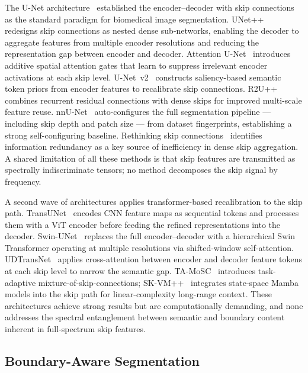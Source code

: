 \documentclass[journal]{IEEEtran}
\begin{document}
The U-Net architecture~\cite{ronneberger2015unet} established the
encoder--decoder with skip connections as the standard paradigm for biomedical
image segmentation.
UNet++~\cite{zhou2019unetpp} redesigns skip connections as nested dense
sub-networks, enabling the decoder to aggregate features from multiple encoder
resolutions and reducing the representation gap between encoder and decoder.
Attention U-Net~\cite{oktay2018attnunet} introduces additive spatial attention
gates that learn to suppress irrelevant encoder activations at each skip level.
U-Net~v2~\cite{peng2023unetv2} constructs saliency-based semantic token priors
from encoder features to recalibrate skip connections.
R2U++~\cite{alom2022r2upp} combines recurrent residual connections with dense
skips for improved multi-scale feature reuse.
nnU-Net~\cite{isensee2021nnu} auto-configures the full segmentation pipeline ---
including skip depth and patch size --- from dataset fingerprints, establishing
a strong self-configuring baseline.
Rethinking skip connections~\cite{rethinkskips2024} identifies information
redundancy as a key source of inefficiency in dense skip aggregation.
A shared limitation of all these methods is that skip features are transmitted
as spectrally indiscriminate tensors; no method decomposes the skip signal by
frequency.

A second wave of architectures applies transformer-based recalibration to
the skip path.
TransUNet~\cite{chen2021transunet} encodes CNN feature maps as sequential tokens
and processes them with a ViT encoder before feeding the refined representations
into the decoder.
Swin-UNet~\cite{cao2021swinunet} replaces the full encoder--decoder with a
hierarchical Swin Transformer operating at multiple resolutions via shifted-window
self-attention.
UDTransNet~\cite{wang2024udtransnet} applies cross-attention between encoder and
decoder feature tokens at each skip level to narrow the semantic gap.
TA-MoSC~\cite{tamosc2025} introduces task-adaptive mixture-of-skip-connections;
SK-VM++~\cite{wu2025skvmpp} integrates state-space Mamba models into the skip
path for linear-complexity long-range context.
These architectures achieve strong results but are computationally demanding,
and none addresses the spectral entanglement between semantic and boundary
content inherent in full-spectrum skip features.

\subsection{Boundary-Aware Segmentation}
\end{document}
